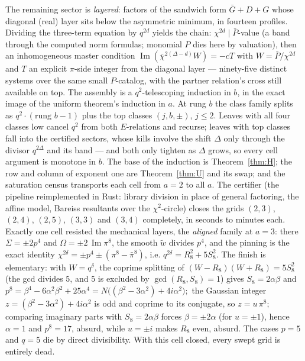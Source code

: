\documentclass[11pt]{article}
\theoremstyle{remark}
\DeclareMathOperator{\im}{Im}
\begin{document}
The remaining sector is \emph{layered}: factors of the sandwich form
$\bar G+D+G$ whose diagonal (real) layer sits below the asymmetric
minimum, in fourteen profiles.  Dividing the three-term equation by
$q^{2d}$ yields the chain: $\chi^{2d}\mid \bar P$-value (a band through
the computed norm formulas; monomial $P$ dies here by valuation), then an
inhomogeneous master condition
$\im(\bar\chi^{2(\Delta-d)}W)=-cT$ with $W=\bar P/\chi^{2d}$ and $T$ an
explicit $\pi$-side integer from the diagonal layer --- ninety-five
distinct systems over the same small $P$-catalog, with the partner
relation's cross still available on top.  The assembly is a $q^2$-telescoping induction in $b$, in the exact
image of the uniform theorem's induction in $a$.  At rung $b$ the class
family splits as $q^2\cdot(\text{rung }b-1)$ plus the top classes
$(j,b,\pm)$, $j\le2$.  Leaves with all four classes low cancel $q^2$ from
both $E$-relations and recurse; leaves with top classes fall into the
certified sectors, whose kills involve the shift $\Delta$ only through
the divisor $q^{2\Delta}$ and its band --- and both only tighten as
$\Delta$ grows, so every cell argument is monotone in $b$.  The base of
the induction is Theorem~\ref{thm:H}; the row and column of exponent one
are Theorem~\ref{thm:U} and its swap; and the saturation census transports
each cell from $a=2$ to all $a$.  The certifier (the pipeline reimplemented in Rust: library division in
place of general factoring, the affine model, Bareiss resultants over the
$\chi^2$-circle) closes the grids $(2,3)$, $(2,4)$, $(2,5)$, $(3,3)$ and
$(3,4)$ completely, in seconds to minutes each.  Exactly one cell resisted
the mechanical layers, the \emph{aligned} family at $a=3$: there
$\Sigma=\pm2p^4$ and $\Omega=\pm2\,\im\pi^8$, the smooth $\tilde w$ divides
$p^4$, and the pinning is the exact identity
$\chi^{2\delta}=\pm p^4\pm(\pi^8-\bar\pi^8)$, i.e.
$q^{2\delta}=R_8^2+5S_8^2$.  The finish is elementary: with $W=q^\delta$,
the coprime splitting of $(W-R_8)(W+R_8)=5S_8^2$ (the gcd divides $5$, and
$5$ is excluded by $\gcd(R_8,S_8)=1$) gives $S_8=2\alpha\beta$ and
$p^8=\beta^4-6\alpha^2\beta^2+25\alpha^4
     =N\bigl((\beta^2-3\alpha^2)+4i\alpha^2\bigr);$
the Gaussian integer $z=(\beta^2-3\alpha^2)+4i\alpha^2$ is odd and coprime
to its conjugate, so $z=u\,\pi^8$; comparing imaginary parts with
$S_8=2\alpha\beta$ forces $\beta=\pm2\alpha$ (for $u=\pm1$), hence
$\alpha=1$ and $p^8=17$, absurd, while $u=\pm i$ makes $R_8$ even, absurd.
The cases $p=5$ and $q=5$ die by direct divisibility.  With this cell
closed, every swept grid is entirely dead.
\end{document}
